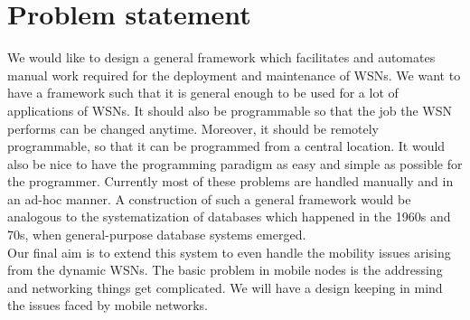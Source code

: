 \documentclass[twocolumn]{article}
\begin{document}
\section{Problem statement}
We would like to design a general framework which facilitates and automates manual work required for the deployment and maintenance of WSNs. We want to have a framework such that it is general enough to be used for a lot of applications of WSNs. It should also be programmable so that the job the WSN performs can be changed anytime. Moreover, it should be remotely programmable, so that it can be programmed from a central location. It would also be nice to have the programming paradigm as easy and simple as possible for the programmer.
Currently most of these problems are handled manually and in an ad-hoc manner. A construction of such a general framework would be analogous to the systematization of databases which happened in the 1960s and 70s, when general-purpose database systems emerged.\\
Our final aim is to extend this system to even handle the mobility issues arising from the dynamic WSNs. The basic problem in mobile nodes is the addressing and networking things get complicated. We will have a design keeping in mind the issues faced by mobile networks.
\end{document}
